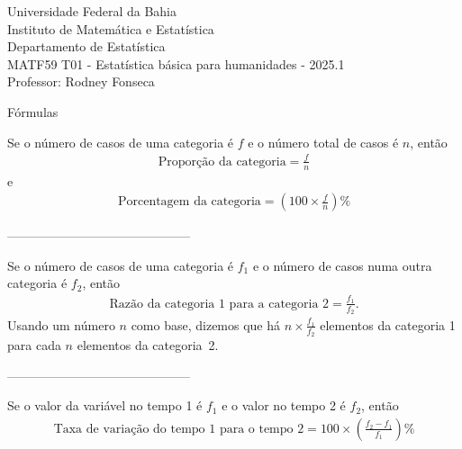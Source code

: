 \documentclass{article}
\date{--/--/----} %
\begin{document}
\begin{flushleft}
	Universidade Federal da Bahia\\
	Instituto de Matemática e Estatística\\
	Departamento de Estatística\\
	MATF59 T01 - Estatística básica para humanidades - 2025.1\\
	Professor: Rodney Fonseca \\
\end{flushleft}

\begin{center}
	\begin{Large}
		Fórmulas \\
	\end{Large}	
\end{center}


\bigskip


\begin{Large}
\noindent
Se o número de casos de uma categoria é $f$ e o número total de casos é $n$, então
\begin{align*}
\text{Proporção da categoria} = \frac{f}{n}
\end{align*}
e
\begin{align*}
\text{Porcentagem da categoria} = \left( 100 \times\frac{f}{n} \right) \%
\end{align*}
\end{Large}

\bigskip
--------------------------------------------


\begin{Large}
\noindent
Se o número de casos de uma categoria é $f_1$ e o número de casos numa outra categoria é $f_2$, então
\begin{align*}
\text{Razão da categoria 1 para a categoria 2} = \frac{f_1}{f_2}.
\end{align*}
Usando um número $n$ como base, dizemos que há $n \times \frac{f_1}{f_2} $ elementos da categoria 1 para cada $n$ elementos da categoria~2.
\end{Large}

\bigskip
--------------------------------------------


\begin{Large}
\noindent
Se o valor da variável no tempo 1 é $f_1$ e o valor no tempo 2 é $f_2$, então
\begin{align*}
\text{Taxa de variação do tempo 1 para o tempo 2} = 100 \times \left(\frac{f_2 - f_1}{f_1}\right)\%
\end{align*}
\end{Large}
\end{document}
